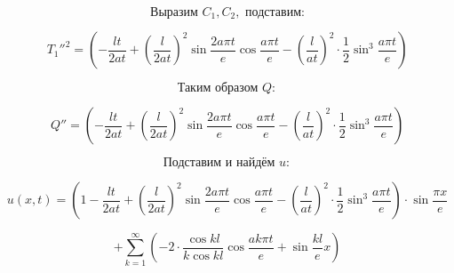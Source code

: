 \documentclass[a4paper,12pt]{article}
\begin{document}
$$\text{Выразим } C_1, C_2, \text{ подставим:}$$

$$T_1''^2 = \left(-\frac{lt}{2at} + \left(\frac{l}{2at}\right)^2 \sin \frac{2a\pi t}{e} \cos \frac{a\pi t}{e} - \left(\frac{l}{at}\right)^2 \cdot \frac{1}{2} \sin^3 \frac{a\pi t}{e} \right)$$

$$\text{Таким образом } Q:$$

$$Q'' = \left(-\frac{lt}{2at} + \left(\frac{l}{2at}\right)^2 \sin \frac{2a\pi t}{e} \cos \frac{a\pi t}{e} - \left(\frac{l}{at}\right)^2 \cdot \frac{1}{2} \sin^3 \frac{a\pi t}{e} \right)$$

$$\text{Подставим и найдём } u:$$

$$u(x,t) = \left(1 - \frac{lt}{2at} + \left(\frac{l}{2at}\right)^2 \sin \frac{2a\pi t}{e} \cos \frac{a\pi t}{e} - \left(\frac{l}{at}\right)^2 \cdot \frac{1}{2} \sin^3 \frac{a\pi t}{e} \right) \cdot \sin \frac{\pi x}{e}$$

$$+ \sum_{k=1}^{\infty} \left( -2 \cdot \frac{\cos kl}{k \cos kl} \cos \frac{a k \pi t}{e} + \sin \frac{kl}{e} x \right)$$
\end{document}
